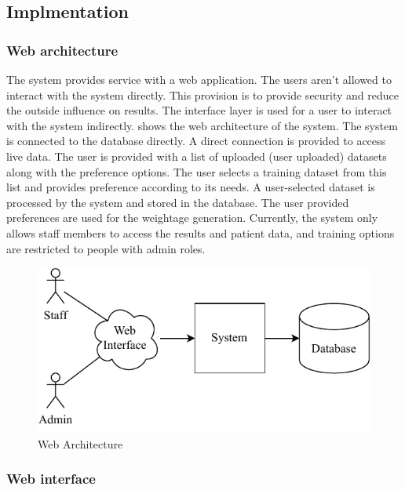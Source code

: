 \documentclass[a4paper,fleqn]{cas-dc}
\begin{document}
\subsection{Implmentation}\label{subsec:implmentation}

\subsubsection{Web architecture}\label{subsubsec:web_architecture}

The system provides service with a web application. The users aren't allowed to interact with the system directly. This provision is to provide security and reduce the outside influence on results. The interface layer is used for a user to interact with the system indirectly.  shows the web architecture of the system. The system is connected to the database directly. A direct connection is provided to access live data. The user is provided with a list of uploaded (user uploaded) datasets along with the preference options. The user selects a training dataset from this list and provides preference according to its needs. A user-selected dataset is processed by the system and stored in the database. The user provided preferences are used for the weightage generation. Currently, the system only allows staff members to access the results and patient data, and training options are restricted to people with admin roles.

\begin{figure}[ht]
    \centering
    \includegraphics[width=0.9\columnwidth]{web_architecture.pdf}
    \caption{Web Architecture}
    \label{fig:web_architecture}
\end{figure}

\subsubsection{Web interface}\label{subsubsec:web_interface}
\end{document}

